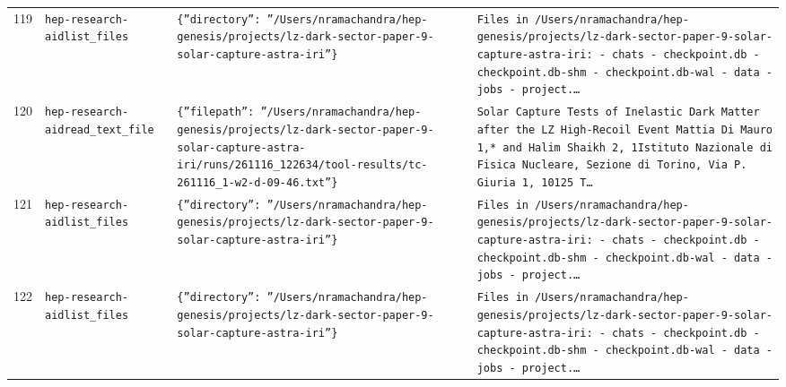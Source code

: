 \documentclass[11pt,a4paper]{article}
\begin{document}
\begin{longtable}{@{}p{}p{}p{}p{}@{}}
119 & \texttt{hep-research-aid}\newline\texttt{list\_\allowbreak{}files} & \texttt{\{''directory'':\allowbreak{} ''/\allowbreak{}Users/\allowbreak{}nramachandra/\allowbreak{}hep-genesis/\allowbreak{}projects/\allowbreak{}lz-dark-sector-paper-9-solar-capture-astra-iri''\}\allowbreak{}} & \texttt{Files in /\allowbreak{}Users/\allowbreak{}nramachandra/\allowbreak{}hep-genesis/\allowbreak{}projects/\allowbreak{}lz-dark-sector-paper-9-solar-capture-astra-iri:\allowbreak{}   - chats   - checkpoint.db   - checkpoint.db-shm   - checkpoint.db-wal   - data   - jobs   - project.\ldots{}\allowbreak{}} \\
120 & \texttt{hep-research-aid}\newline\texttt{read\_\allowbreak{}text\_\allowbreak{}file} & \texttt{\{''filepath'':\allowbreak{} ''/\allowbreak{}Users/\allowbreak{}nramachandra/\allowbreak{}hep-genesis/\allowbreak{}projects/\allowbreak{}lz-dark-sector-paper-9-solar-capture-astra-iri/\allowbreak{}runs/\allowbreak{}261116\_\allowbreak{}122634/\allowbreak{}tool-results/\allowbreak{}tc-261116\_\allowbreak{}1-w2-d-09-46.txt''\}\allowbreak{}} & \texttt{Solar Capture Tests of Inelastic Dark Matter after the LZ High-Recoil Event Mattia Di Mauro 1,\allowbreak{}* and Halim Shaikh 2,\allowbreak{}\dag{}\allowbreak{} 1Istituto Nazionale di Fisica Nucleare,\allowbreak{} Sezione di Torino,\allowbreak{} Via P. Giuria 1,\allowbreak{} 10125 T\ldots{}\allowbreak{}} \\
121 & \texttt{hep-research-aid}\newline\texttt{list\_\allowbreak{}files} & \texttt{\{''directory'':\allowbreak{} ''/\allowbreak{}Users/\allowbreak{}nramachandra/\allowbreak{}hep-genesis/\allowbreak{}projects/\allowbreak{}lz-dark-sector-paper-9-solar-capture-astra-iri''\}\allowbreak{}} & \texttt{Files in /\allowbreak{}Users/\allowbreak{}nramachandra/\allowbreak{}hep-genesis/\allowbreak{}projects/\allowbreak{}lz-dark-sector-paper-9-solar-capture-astra-iri:\allowbreak{}   - chats   - checkpoint.db   - checkpoint.db-shm   - checkpoint.db-wal   - data   - jobs   - project.\ldots{}\allowbreak{}} \\
122 & \texttt{hep-research-aid}\newline\texttt{list\_\allowbreak{}files} & \texttt{\{''directory'':\allowbreak{} ''/\allowbreak{}Users/\allowbreak{}nramachandra/\allowbreak{}hep-genesis/\allowbreak{}projects/\allowbreak{}lz-dark-sector-paper-9-solar-capture-astra-iri''\}\allowbreak{}} & \texttt{Files in /\allowbreak{}Users/\allowbreak{}nramachandra/\allowbreak{}hep-genesis/\allowbreak{}projects/\allowbreak{}lz-dark-sector-paper-9-solar-capture-astra-iri:\allowbreak{}   - chats   - checkpoint.db   - checkpoint.db-shm   - checkpoint.db-wal   - data   - jobs   - project.\ldots{}\allowbreak{}} \\

\end{longtable}
\end{document}
